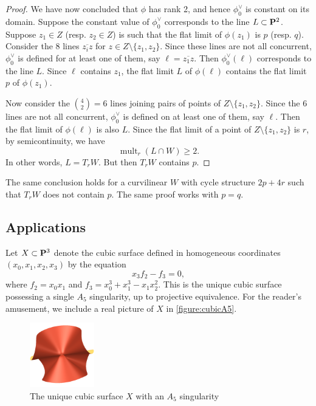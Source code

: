 \documentclass[12pt,reqno]{amsart}
\DeclareMathOperator{\mult}{mult}
\numberwithin{equation}{section}
\begin{document}
\begin{proof}
  We have now concluded that $\phi$ has rank 2, and hence $\phi_0^\vee$ is constant on its domain.
  Suppose the constant value of $\phi_0^\vee$ corresponds to the line $L \subset \P^2$.
  Suppose $z_1 \in Z$ (resp. $z_2 \in Z$) is such that the flat limit of $\phi(z_1)$ is $p$ (resp. $q$).
  Consider the 8 lines $\overline {z_i z}$ for $z \in Z \setminus \{z_1,z_2\}$.
  Since these lines are not all concurrent, $\phi_0^\vee$ is defined for at least one of them, say $\ell = \overline {z_1 z}$.
  Then $\phi^\vee_0(\ell)$ corresponds to the line $L$.
  Since $\ell$ contains $z_1$, the flat limit $L$ of $\phi(\ell)$ contains the flat limit $p$ of $\phi(z_1)$.

  Now consider the ${4 \choose 2} = 6$ lines joining pairs of points of $Z \setminus \{z_1,z_2\}$.
  Since the 6 lines are not all concurrent, $\phi_0^\vee$ is defined on at least one of them, say $\ell$.
  Then the flat limit of $\phi(\ell)$ is also $L$.
  Since the flat limit of a point of $Z \setminus \{z_1,z_2\}$ is $r$, by semicontinuity, we have
  \[ \mult_r(L \cap W) \geq 2.\]
  In other words, $L = T_rW$.
  But then $T_rW$ contains $p$.
\end{proof}
\begin{remark}\label{prop:2p4r}
  The same conclusion holds for a curvilinear $W$ with cycle structure $2p + 4r$ such that $T_rW$ does not contain $p$.
  The same proof works with $p = q$.
\end{remark}

\subsection{Applications}
Let $X \subset \P^{3}$ denote the cubic surface defined in homogeneous coordinates $\left(x_{0}, x_{1}, x_{2}, x_{3}\right)$ by the equation \[x_{3}f_{2} - f_{3} = 0,\] where $f_{2} = x_{0}x_{1}$ and $f_{3} = x_{0}^3 + x_{1}^{3}-x_{1}x_{2}^{2}$.
This is the unique cubic surface possessing a single $A_5$ singularity, up to projective equivalence.
For the reader's amusement, we include a real picture of $X$ in \autoref{figure:cubicA5}.
\begin{figure}
  \centering
  \includegraphics[width=0.25\textwidth]{cubicA5}
  \caption{The unique cubic surface $X$ with an $A_5$ singularity}
  \label{figure:cubicA5}
\end{figure}
\end{document}
